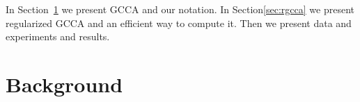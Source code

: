 \documentclass[11pt]{article}
\begin{document}
In Section~\ref{sec:gcca} we present GCCA and our notation. In
Section\ref{sec:rgcca} we present regularized GCCA 
 and an efficient way to compute it. Then we present data and experiments and results.

\section{Background}
\label{sec:gcca}



\end{document}

